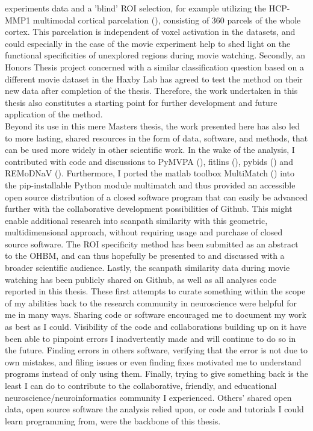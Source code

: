 \documentclass[a4paper, 12pt]{scrreprt}
\begin{document}
experiments data and a 'blind' ROI selection, for example utilizing the HCP-MMP1 multimodal cortical parcelation (\cite{glasser2016multi}), consisting of 360 parcels of the whole cortex. This parcelation is independent of voxel activation in the datasets, and could especially in the case of the movie experiment help to shed light on the functional specificities of unexplored regions during movie watching. Secondly, an Honors Thesis project concerned with a similar classification question based on a different movie dataset in the Haxby Lab has agreed to test the method on their new data after completion of the thesis. Therefore, the work undertaken in this thesis also constitutes a starting point for further development and future application of the method.
\\
Beyond its use in this mere Masters thesis, the work presented here has also led to more lasting, shared resources in the form of data, software, and methods, that can be used more widely in other scientific work. In the wake of the analysis, I contributed with code and discussions to PyMVPA (\cite{hanke2009pymvpa}), fitlins (\cite{markiewicz_christopher_j_2019_2555453}), pybids (\cite{yarkoni_tal_2019_2555449}) and REMoDNaV (\cite{dar2019}). Furthermore, I ported the matlab toolbox MultiMatch (\cite{dewhurst2012depends}) into the pip-installable Python module multimatch and thus provided an accessible open source distribution of a closed software program that can easily be advanced further with the collaborative development possibilities of Github. This might enable additional research into scanpath similarity with this geometric, multidimensional approach, without requiring usage and purchase of closed source software. The ROI specificity method has been submitted as an abstract to the OHBM, and can thus hopefully be presented to and discussed with a broader scientific audience. Lastly, the scanpath similarity data during movie watching has been publicly shared on Github, as well as all analyses code reported in this thesis. These first attempts to curate something within the scope of my abilities back to the research community in neuroscience were helpful for me in many ways. Sharing code or software encouraged me to document my work as best as I could. Visibility of the code and collaborations building up on it have been able to pinpoint errors I inadvertently made and will continue to do so in the future. Finding errors in others software, verifying that the error is not due to own mistakes, and filing issues or even finding fixes motivated me to understand programs instead of only using them. Finally, trying to give something back is the least I can do to contribute to the collaborative, friendly, and educational neuroscience/neuroinformatics community I experienced. Others' shared open data, open source software the analysis relied upon, or code and tutorials I could learn programming from, were the backbone of this thesis.
\end{document}
